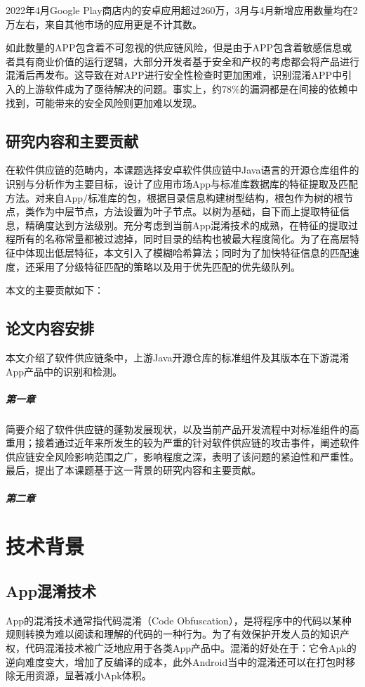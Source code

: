 2022年4月Google Play商店内的安卓应用超过260万，3月与4月新增应用数量均在2万左右，来自其他市场的应用更是不计其数。

如此数量的APP包含着不可忽视的供应链风险，但是由于APP包含着敏感信息或者具有商业价值的运行逻辑，大部分开发者基于安全和产权的考虑都会将产品进行混淆后再发布。这导致在对APP进行安全性检查时更加困难，识别混淆APP中引入的上游软件成为了亟待解决的问题。事实上，约78\%的漏洞都是在间接的依赖中找到，可能带来的安全风险则更加难以发现\cite{qianxin.com}。


\section{研究内容和主要贡献}
在软件供应链的范畴内，本课题选择安卓软件供应链中Java语言的开源仓库组件的识别与分析作为主要目标，设计了应用市场App与标准库数据库的特征提取及匹配方法。对来自App/标准库的包，根据目录信息构建树型结构，根包作为树的根节点，类作为中层节点，方法设置为叶子节点。以树为基础，自下而上提取特征信息，精确度达到方法级别。充分考虑到当前App混淆技术的成熟，在特征的提取过程所有的名称常量都被过滤掉，同时目录的结构也被最大程度简化。为了在高层特征中体现出低层特征，本文引入了模糊哈希算法；同时为了加快特征信息的匹配速度，还采用了分级特征匹配的策略以及用于优先匹配的优先级队列。

本文的主要贡献如下：

\section{论文内容安排}
本文介绍了软件供应链条中，上游Java开源仓库的标准组件及其版本在下游混淆App产品中的识别和检测。

\paragraph{第一章}简要介绍了软件供应链的蓬勃发展现状，以及当前产品开发流程中对标准组件的高重用；接着通过近年来所发生的较为严重的针对软件供应链的攻击事件，阐述软件供应链安全风险影响范围之广，影响程度之深，表明了该问题的紧迫性和严重性。最后，提出了本课题基于这一背景的研究内容和主要贡献。
\paragraph{第二章}


\chapter{技术背景}

\section{App混淆技术}
App的混淆技术通常指代码混淆（Code Obfuscation），是将程序中的代码以某种规则转换为难以阅读和理解的代码的一种行为。为了有效保护开发人员的知识产权，代码混淆技术被广泛地应用于各类App产品中。混淆的好处在于：它令Apk的逆向难度变大，增加了反编译的成本，此外Android当中的混淆还可以在打包时移除无用资源，显著减小Apk体积\cite{dong2018understanding}。


